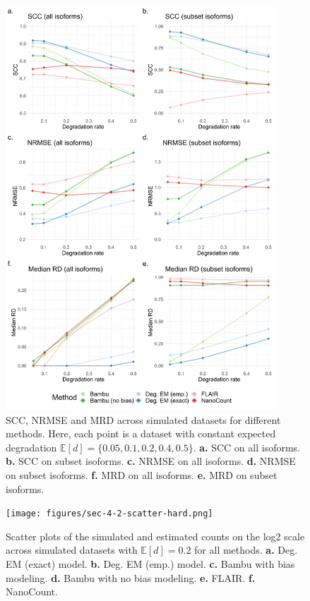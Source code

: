 \begin{figure}[H]
    \centering
    \includegraphics[width=0.9\textwidth]{figures/sec-4-2-scc-nrmse.png}
    \caption[SCC, NRMSE and MRD across simulated datasets for different methods]{SCC, NRMSE and MRD across simulated datasets for different methods. Here, each point is a dataset with constant expected degradation $\mathbb{E}[d]=\{0.05,0.1,0.2,0.4,0.5\}$. \textbf{a.} SCC on all isoforms. \textbf{b.} SCC on subset isoforms. \textbf{c.} NRMSE on all isoforms. \textbf{d.} NRMSE on subset isoforms. \textbf{f.} MRD on all isoforms. \textbf{e.} MRD on subset isoforms.}
    \label{fig:4-2-scc-nrmse}
\end{figure}

\newpage

\begin{figure}[H]
    \centering
    \texttt{[image: figures/sec-4-2-scatter-hard.png]}
    \caption[Scatter plots across simulated datasets for different methods]{Scatter plots of the simulated and estimated counts on the log2 scale across simulated datasets with $\mathbb{E}[d]=0.2$ for all methods. \textbf{a.} Deg. EM (exact) model. \textbf{b.} Deg. EM (emp.) model. \textbf{c.} Bambu with bias modeling. \textbf{d.} Bambu with no bias modeling. \textbf{e.} FLAIR. \textbf{f.} NanoCount.}
    \label{fig:4-2-scatter}
\end{figure}

